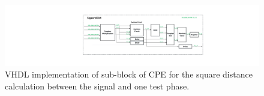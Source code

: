 \begin{refsection}
\begin{figure}[h!]
    \centering
    \includegraphics[width=15cm]{./sdf/dsp_laser_phase_compensation/figures/squareDist.pdf}
    \caption{VHDL implementation of sub-block of CPE for the square distance calculation between the signal and one test phase.}
    \label{fig_SDVhdlL2}
\end{figure}

%
%	
%


\clearpage
\printbibliography[heading=subbibliography]
\end{refsection}
\cleardoublepage
